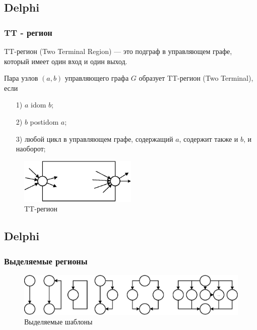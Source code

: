 \documentclass{beamer}
\begin{document}
\subsection{Delphi}
\begin{frame}
\frametitle{TT - регион}

\scriptsize{
\newtheorem{TT}{Определение}[section]
\begin{Def}
	TT-регион (Two Terminal Region) --- это подграф в управляющем графе, который имеет один вход и один выход.
\end{Def}

\newtheorem{TTreg}{Определение}[section]
\begin{Def}
	Пара узлов $(a, b)$ управляющего графа $G$ образует TT-регион (Two Terminal), если
	\begin{enumerate}
		\item[1)]	
			$a$ idom $b$;
		\item[2)] 
			$b$ postidom $a$;
		\item[3)] 	
			любой цикл в управляющем графе, содержащий $a$, содержит также и $b$, и наоборот;
	\end{enumerate}
\end{Def}


\begin{figure}[htbp]
	\centering
		\includegraphics[width=0.5\textwidth]{Pic/TTRegion.eps}
	\caption{TT-регион}
	\label{fig:TTRegion}
\end{figure}
}

\end{frame}


\subsection{Delphi}
\begin{frame}
\frametitle{Выделяемые регионы}
\begin{figure}[htbp]
	\centering
		\includegraphics[width=1\textwidth]{Pic/Reg.eps}
	\caption{Выделяемые шаблоны}
	\label{fig:Regions}
\end{figure}
\end{frame}
\end{document}
